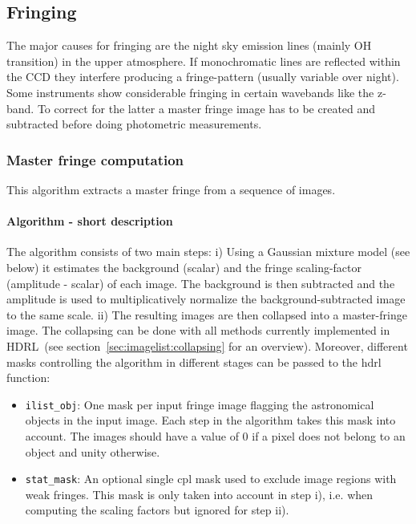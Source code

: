 \subsection{Fringing}
\label{fringe:main}


The major causes for fringing are the night sky emission lines (mainly
OH transition) in the upper atmosphere. If monochromatic lines are
reflected within the CCD they interfere producing a fringe-pattern
(usually variable over night). Some instruments show considerable
fringing in certain wavebands like the z-band. To correct for the
latter a master fringe image has to be created and subtracted before
doing photometric measurements.

\subsubsection{Master fringe computation}
\label{fringe:algorithms:compute}

This algorithm extracts a master fringe from a sequence of images.


\paragraph{Algorithm - short description}
\label{fringe:algorithms:compute:short}


The algorithm consists of two main steps: i) Using a Gaussian mixture
model (see below) it estimates the background (scalar) and the fringe
scaling-factor (amplitude - scalar) of each image. The background is
then subtracted and the amplitude is used to multiplicatively
normalize the background-subtracted image to the same scale.  ii) The
resulting images are then collapsed into a master-fringe image. The
collapsing can be done with all methods currently implemented in
HDRL~(see section~\ref{sec:imagelist:collapsing} for an
overview). Moreover, different masks controlling the algorithm in
different stages can be passed to the hdrl function: 

\begin{itemize}
\item \verb,ilist_obj,: One mask per input fringe image flagging the
  astronomical objects in the input image. Each step in the algorithm
  takes this mask into account. The images should have a value of 0 if
  a pixel does not belong to an object and unity otherwise.
\item \verb,stat_mask,: An optional single cpl mask used to exclude
  image regions with weak fringes. This mask is only taken into
  account in step i), i.e. when computing the scaling factors but
  ignored for step ii).
\end{itemize}

